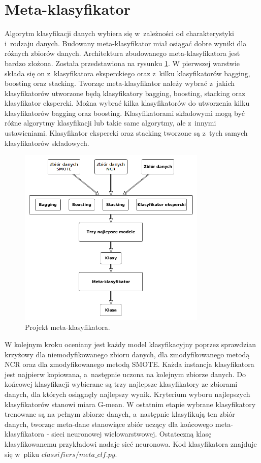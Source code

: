 \section{Meta-klasyfikator}
Algorytm klasyfikacji danych wybiera się w~zależności od charakterystyki i~rodzaju danych. Budowany meta-klasyfikator miał osiągać dobre wyniki dla różnych zbiorów danych. Architektura zbudowanego meta-klasyfikatora jest bardzo złożona. Została przedstawiona na rysunku \ref{fig:metaklasmoj}. W pierwszej warstwie składa się on z~klasyfikatora eksperckiego oraz z~kilku klasyfikatorów bagging, boosting oraz stacking. Tworząc meta-klasyfikator należy wybrać z~jakich klasyfikatorów utworzone będą klasyfikatory bagging, boosting, stacking oraz klasyfikator ekspercki. Można wybrać kilka klasyfikatorów do utworzenia kilku klasyfikatorów bagging oraz boosting. Klasyfikatorami składowymi mogą być różne algorytmy klasyfikacji lub takie same algorytmy, ale z~innymi ustawieniami. Klasyfikator ekspercki oraz stacking tworzone są z~tych samych klasyfikatorów składowych. 
\begin{figure}[H]
	\centering
	\includegraphics[width=0.8\textwidth]{./images/metaklas.png}
	\caption{Projekt meta-klasyfikatora.}
	\label{fig:metaklasmoj}
\end{figure}W kolejnym kroku oceniany jest każdy model klasyfikacyjny poprzez sprawdzian krzyżowy dla niemodyfikowanego zbioru danych, dla zmodyfikowanego metodą NCR oraz dla zmodyfikowanego metodą SMOTE. Każda instancja klasyfikatora jest najpierw kopiowana, a~następnie uczona na kolejnym zbiorze danych. Do końcowej klasyfikacji wybierane są trzy najlepsze klasyfikatory ze zbiorami danych, dla których osiągnęły najlepszy wynik. Kryterium wyboru najlepszych klasyfikatorów stanowi miara G-mean. W ostatnim etapie wybrane klasyfikatory trenowane są na pełnym zbiorze danych, a~następnie klasyfikują ten zbiór danych, tworząc meta-dane stanowiące zbiór uczący dla końcowego meta-klasyfikatora - sieci neuronowej wielowarstwowej. Ostateczną klasę klasyfikowanemu przykładowi nadaje sieć neuronowa. Kod klasyfikatora znajduje się w~pliku $classifiers/meta\_clf.py$.

